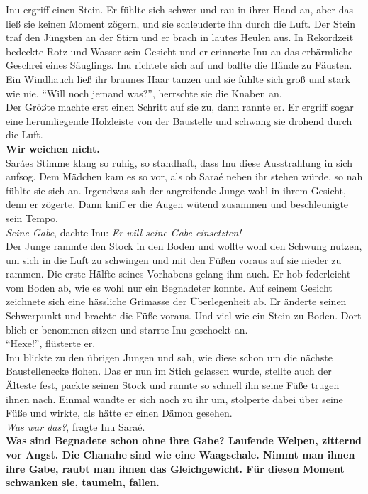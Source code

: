 Inu ergriff einen Stein. Er fühlte sich schwer und rau in ihrer Hand an, aber das ließ sie keinen 
Moment zögern, und sie schleuderte ihn durch die Luft. Der Stein traf den Jüngsten an der Stirn und 
er brach in lautes Heulen aus. In Rekordzeit bedeckte Rotz und Wasser sein Gesicht und er erinnerte 
Inu an das erbärmliche Geschrei eines Säuglings. Inu richtete sich auf und ballte die Hände zu 
Fäusten. Ein Windhauch ließ ihr braunes Haar tanzen und sie fühlte sich groß und stark wie nie.
``Will noch jemand was?'', herrschte sie die Knaben an. \\
Der Größte machte erst einen Schritt auf sie zu, dann rannte er. Er ergriff sogar eine 
herumliegende 
Holzleiste von der Baustelle und schwang sie drohend durch die Luft.\\
\textbf{Wir weichen nicht.}\\
Saráes Stimme klang so ruhig, so standhaft, dass Inu diese Ausstrahlung in sich aufsog. Dem Mädchen 
kam es so vor, als ob Saraé neben ihr stehen würde, so nah fühlte sie sich an. Irgendwas sah der 
angreifende Junge wohl in ihrem Gesicht, denn er zögerte. Dann kniff er die Augen wütend zusammen 
und beschleunigte sein Tempo.\\
\textit{Seine Gabe}, dachte Inu: \textit{Er will seine Gabe einsetzten!}\\
Der Junge rammte den Stock in den Boden und wollte wohl den Schwung nutzen, um sich in die Luft zu 
schwingen und mit den Füßen voraus auf sie nieder zu rammen. Die erste Hälfte seines Vorhabens 
gelang ihm auch. Er hob federleicht vom Boden ab, wie es wohl nur ein Begnadeter konnte. Auf seinem 
Gesicht zeichnete sich eine hässliche Grimasse der Überlegenheit ab. Er änderte seinen Schwerpunkt 
und brachte die Füße voraus. Und viel wie ein Stein zu Boden. Dort blieb er benommen sitzen und 
starrte Inu geschockt an. \\
``Hexe!'', flüsterte er. \\
Inu blickte zu den übrigen Jungen und sah, wie diese schon um die nächste Baustellenecke flohen. 
Das er nun im Stich gelassen wurde, stellte auch der Älteste fest, packte seinen Stock und rannte 
so schnell ihn seine Füße trugen ihnen nach. Einmal wandte er sich noch zu ihr um, stolperte dabei 
über seine Füße und wirkte, als hätte er einen Dämon gesehen. \\
\textit{Was war das?}, fragte Inu Saraé.\\
\textbf{Was sind Begnadete schon ohne ihre Gabe? Laufende Welpen, zitternd vor Angst. Die Chanahe 
sind wie eine Waagschale. Nimmt man ihnen ihre Gabe, raubt man ihnen das Gleichgewicht. Für diesen 
Moment schwanken sie, taumeln, fallen.}\\
